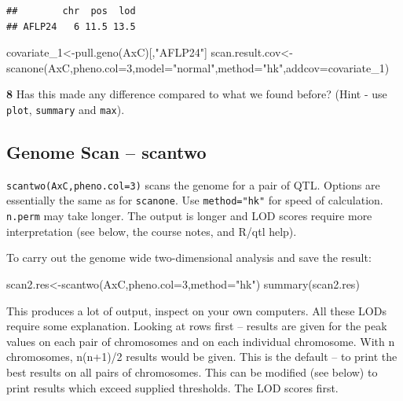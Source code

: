 \documentclass[
]{book}
\makeatletter
\newenvironment{Shaded}{\begin{snugshade}}{\end{snugshade}}
\newcommand{\AttributeTok}[1]{\textcolor[rgb]{0.77,0.63,0.00}{#1}}
\newcommand{\DecValTok}[1]{\textcolor[rgb]{0.00,0.00,0.81}{#1}}
\newcommand{\FunctionTok}[1]{\textcolor[rgb]{0.00,0.00,0.00}{#1}}
\newcommand{\NormalTok}[1]{#1}
\newcommand{\OtherTok}[1]{\textcolor[rgb]{0.56,0.35,0.01}{#1}}
\newcommand{\StringTok}[1]{\textcolor[rgb]{0.31,0.60,0.02}{#1}}
\newenvironment{kframe}{%
\medskip{}
\setlength{\fboxsep}{.8em}
 \def\at@end@of@kframe{}%
 \ifinner\ifhmode%
  \def\at@end@of@kframe{\end{minipage}}%
  \begin{minipage}{\columnwidth}%
 \fi\fi%
 \def\FrameCommand##1{\hskip\@totalleftmargin \hskip-\fboxsep
 \colorbox{shadecolor}{##1}\hskip-\fboxsep
     \hskip-\linewidth \hskip-\@totalleftmargin \hskip\columnwidth}%
 \MakeFramed {\advance\hsize-\width
   \@totalleftmargin\z@ \linewidth\hsize
   \@setminipage}}%
 {\par\unskip\endMakeFramed%
 \at@end@of@kframe}
\newenvironment{rmdblock}[1]
  {
  \begin{itemize}
  \renewcommand{\labelitemi}{
    \raisebox{-.7\height}[0pt][0pt]{
      {\setkeys{Gin}{width=3em,keepaspectratio}\texttt{[image: images/\#1]}}
    }
  }
  \setlength{\fboxsep}{1em}
  \begin{kframe}
  \item
  }
  {
  \end{kframe}
  \end{itemize}
  }
\newenvironment{rmdquiz}
  {\begin{rmdblock}{quiz}}
  {\end{rmdblock}}
\makeatother
\begin{document}
\begin{verbatim}
##        chr  pos  lod
## AFLP24   6 11.5 13.5
\end{verbatim}

\begin{Shaded}
\begin{Highlighting}[]
\NormalTok{covariate\_1}\OtherTok{\textless{}{-}}\FunctionTok{pull.geno}\NormalTok{(AxC)[,}\StringTok{"AFLP24"}\NormalTok{] }
\NormalTok{scan.result.cov}\OtherTok{\textless{}{-}}\FunctionTok{scanone}\NormalTok{(AxC,}\AttributeTok{pheno.col=}\DecValTok{3}\NormalTok{,}\AttributeTok{model=}\StringTok{"normal"}\NormalTok{,}\AttributeTok{method=}\StringTok{"hk"}\NormalTok{,}\AttributeTok{addcov=}\NormalTok{covariate\_1) }
\end{Highlighting}
\end{Shaded}

\begin{rmdquiz}
\textbf{8}
Has this made any difference compared to what we found before? (Hint - use \texttt{plot}, \texttt{summary} and \texttt{max}).\\
\end{rmdquiz}

\hypertarget{genome-scan-scantwo}{%
\subsection{Genome Scan -- scantwo}\label{genome-scan-scantwo}}

\texttt{scantwo(AxC,pheno.col=3)} scans the genome for a pair of QTL. Options are essentially the same as for \texttt{scanone}. Use \texttt{method="hk"} for speed of calculation. \texttt{n.perm} may take longer. The output is longer and LOD scores require more interpretation (see below, the course notes, and R/qtl help).

To carry out the genome wide two-dimensional analysis and save the result:

\begin{Shaded}
\begin{Highlighting}[]
\NormalTok{scan2.res}\OtherTok{\textless{}{-}}\FunctionTok{scantwo}\NormalTok{(AxC,}\AttributeTok{pheno.col=}\DecValTok{3}\NormalTok{,}\AttributeTok{method=}\StringTok{"hk"}\NormalTok{)  }
\FunctionTok{summary}\NormalTok{(scan2.res) }
\end{Highlighting}
\end{Shaded}

This produces a lot of output, inspect on your own computers. All these LODs require some explanation.
Looking at rows first -- results are given for the peak values on each pair of chromosomes and on each individual chromosome. With n chromosomes, n(n+1)/2 results would be given. This is the default -- to print the best results on all pairs of chromosomes. This can be modified (see below) to print results which exceed supplied thresholds. The LOD scores first.
\end{document}
